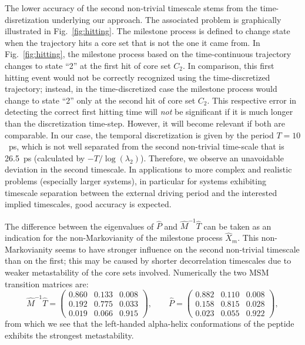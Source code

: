 \documentclass[journal=jctcce,manuscript=article]{achemso}
\newcommand{\redrevision}[1]{{\color{red} #1}}
\begin{document}
\redrevision{
The lower accuracy of the second non-trivial timescale stems from the
time-disretization underlying our approach. The associated problem is graphically
illustrated in Fig.~\ref{fig:hitting}.  The milestone process is defined
to change state when the trajectory hits a core set that is not the
one it came from.  In Fig.~\ref{fig:hitting}, the milestone process based on the time-continuous trajectory changes to state ``2'' at the
first hit of core set $C_2$. In comparison, this first hitting
event would not be correctly recognized using the time-discretized trajectory; instead, in the time-discretized case 
the milestone process would change to state ``2'' only at the second
hit of core set $C_2$. This respective error in detecting the correct first hitting time will \emph{not} be significant if it is much longer than the discretization time-step.
However, it will become relevant if both are comparable. In our case, the temporal discretization is given by the period $T=10$~ps, which is not well separated from the second non-trivial time-scale
that is 26.5~ps (calculated by $-T/\log(\lambda_2)$). Therefore, we observe an unavoidable deviation in the second timescale.
In applications to more complex and realistic problems (especially larger systems), in particular for
systems exhibiting timescale separation between the external driving period and the interested implied
timescales, good accuracy is expected.}

The difference between the eigenvalues of $\hat P$ and $\hat{M}^{-1}\hat T$
  can be taken as an indication for the non-Markovianity of the milestone process $\hat X_m$. This
  non-Markovianity seems to have stronger influence on the second non-trivial timescale than on the first; this may be caused by shorter decorrelation timescales due to weaker metastability of the core sets involved.
Numerically the two MSM transition matrices are:
\[
\hat{M}^{-1}\hat{T}=\left(\begin{array}{ccc}
   0.860 &   0.133 &   0.008 \\
    0.192  &  0.775  &  0.033\\
    0.019   & 0.066 &   0.915
\end{array}
\right),\qquad \hat{P}=\left(\begin{array}{ccc}
   0.882 &   0.110 &   0.008 \\
    0.158  &  0.815  &  0.028\\
    0.023   & 0.055 &   0.922
\end{array}
\right),
\]
from which we see that  the left-handed alpha-helix conformations of the peptide exhibits the strongest metastability. 
\end{document}
